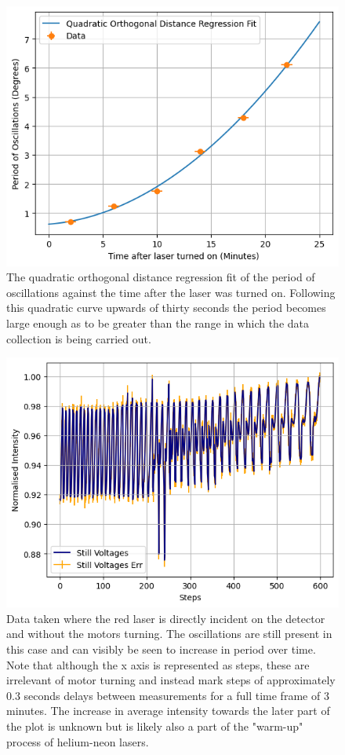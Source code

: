 \documentclass[%
reprint,
amsmath,amssymb,
aps,
]{revtex4-2}
\begin{document}
			\begin{figure}
				\includegraphics[width=0.85\columnwidth]{quadraticFit.png}
				\caption{\label{fig:quadraticDependence}The quadratic orthogonal distance regression fit of the period of oscillations against the time after the laser was turned on. Following this quadratic curve upwards of thirty seconds the period becomes large enough as to be greater than the range in which the data collection is being carried out.}
			\end{figure}
			\begin{figure}
				\includegraphics[width=0.85\columnwidth]{stillData.png}
				\caption{\label{fig:stillData}Data taken where the red laser is directly incident on the detector and without the motors turning. The oscillations are still present in this case and can visibly be seen to increase in period over time. Note that although the x axis is represented as steps, these are irrelevant of motor turning and instead mark steps of approximately 0.3 seconds delays between measurements for a full time frame of 3 minutes. The increase in average intensity towards the later part of the plot is unknown but is likely also a part of the "warm-up" process of helium-neon lasers.}
			\end{figure}
\end{document}
